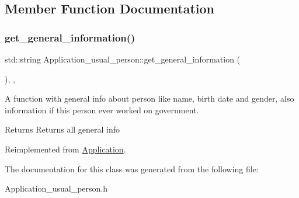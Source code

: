\subsection{Member Function Documentation}
\mbox{\label{classApplication__usual__person_a6ea5c42c57eb422761d4b208eb8ffaca}} 
\subsubsection{\texorpdfstring{get\+\_\+general\+\_\+information()}{get\_general\_information()}}
{\footnotesize\ttfamily std\+::string Application\+\_\+usual\+\_\+person\+::get\+\_\+general\+\_\+information (\begin{DoxyParamCaption}{ }\end{DoxyParamCaption})\hspace{0.3cm}{\ttfamily [inline]}, {\ttfamily [override]}, {\ttfamily [virtual]}}



A function with general info about person like name, birth date and gender, also information if this person ever worked on government. 

\begin{DoxyReturn}{Returns}
Returns all general info 
\end{DoxyReturn}


Reimplemented from \mbox{\hyperlink{classApplication_ab53eea16f9023504def363a58eee2240}{Application}}.



The documentation for this class was generated from the following file\+:\begin{DoxyCompactItemize}
\item 
Application\+\_\+usual\+\_\+person.\+h\end{DoxyCompactItemize}
